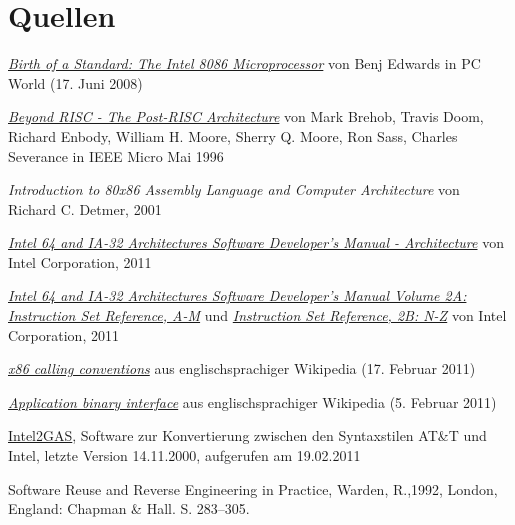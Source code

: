 \section{Quellen}

\begin{thebibliography}{9}

  \href{http://www.pcworld.com/article/146957/birth_of_a_standard_the_intel_8086_microprocessor.html}{
  \emph{Birth of a Standard: The Intel 8086 Microprocessor}}
	von Benj Edwards
	in PC World (17. Juni 2008)
	

	\href{http://www.cse.msu.edu/~enbody/postrisc/postrisc2.htm}{\emph{Beyond RISC - The Post-RISC Architecture}}
	von Mark Brehob, Travis Doom, Richard Enbody, William H. Moore, Sherry Q. Moore, Ron Sass, Charles Severance
	in IEEE Micro Mai 1996

	\emph{Introduction to 80x86 Assembly Language and Computer Architecture}
	von Richard C. Detmer,
	2001

	\href{http://www.intel.com/Assets/PDF/manual/253665.pdf}{
	\emph{Intel 64 and IA-32 Architectures Software Developer's Manual - Architecture}}
	von Intel Corporation,
	2011

	\href{http://www.intel.com/Assets/PDF/manual/253666.pdf}{
	\emph{Intel 64 and IA-32 Architectures Software Developer's Manual Volume 2A: Instruction Set Reference, A-M}} und
	\href{http://www.intel.com/Assets/PDF/manual/253667.pdf}{
	\emph{Instruction Set Reference, 2B: N-Z}}	von Intel Corporation,
	2011

	\href{https://secure.wikimedia.org/wikipedia/en/w/index.php?title=X86_calling_conventions&oldid=414385219}{\emph{x86 calling conventions}} aus englischsprachiger Wikipedia (17. Februar 2011)

	\href{https://secure.wikimedia.org/wikipedia/en/w/index.php?title=Application_binary_interface&oldid=412119478}{\emph{Application binary interface}} aus englischsprachiger Wikipedia (5. Februar 2011)

	\href{http://www.niksula.hut.fi/~mtiihone/intel2gas/}{Intel2GAS}, Software zur Konvertierung zwischen den Syntaxstilen AT\&T und Intel, letzte Version 14.11.2000, aufgerufen am 19.02.2011

 Software Reuse and Reverse Engineering in Practice, Warden, R.,1992, London, England: Chapman \& Hall. S. 283–305.

\end{thebibliography}
